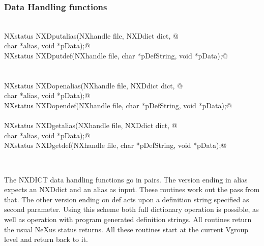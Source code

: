 \documentclass[12pt]{article}
\begin{document}
\subsubsection{Data Handling functions}
\begin{flushleft} \small
\begin{minipage}{\linewidth} \label{scrap3}
\vspace{-1ex}
\begin{list}{}{} \item
\mbox{}\verb@@\\
\mbox{}\verb@   NXstatus NXDputalias(NXhandle file, NXDdict dict, @\\
\mbox{}\verb@                        char *alias, void *pData);@\\
\mbox{}\verb@   NXstatus NXDputdef(NXhandle file, char *pDefString, void *pData);@\\
\mbox{}\verb@@\\
\mbox{}\verb@@\\
\mbox{}\verb@   NXstatus NXDopenalias(NXhandle file, NXDdict dict, @\\
\mbox{}\verb@                        char *alias, void *pData);@\\
\mbox{}\verb@   NXstatus NXDopendef(NXhandle file, char *pDefString, void *pData);@\\
\mbox{}\verb@@\\
\mbox{}\verb@   NXstatus NXDgetalias(NXhandle file, NXDdict dict, @\\
\mbox{}\verb@                        char *alias, void *pData);@\\
\mbox{}\verb@   NXstatus NXDgetdef(NXhandle file, char *pDefString, void *pData);@\\
\end{list}
\vspace{-1ex}
\footnotesize\addtolength{\baselineskip}{-1ex}
\end{minipage}\\[4ex]
\end{flushleft}
The NXDICT data handling functions go in pairs. The version ending in
 alias expects an NXDdict and an alias as input. These routines work
 out the pass from that. The other version ending on def acts upon 
 a definition string specified as second parameter. Using this scheme
 both full dictionary operation is possible, as well as operation with
 program generated definition strings. All routines return the
 usual NeXus status returns. All these routines start at the current Vgroup
 level and return back to it.  
\end{document}
